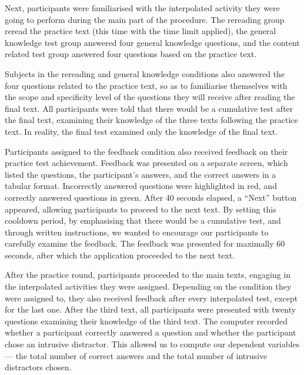 \documentclass[11pt,]{article}
\begin{document}
Next, participants were familiarised with the interpolated activity they
were going to perform during the main part of the procedure. The
rereading group reread the practice text (this time with the time limit
applied), the general knowledge test group answered four general
knowledge questions, and the content related test group answered four
questions based on the practice text.

Subjects in the rereading and general knowledge conditions also answered
the four questions related to the practice text, so as to familiarise
themselves with the scope and specificity level of the questions they
will receive after reading the final text. All participants were told
that there would be a cumulative test after the final text, examining
their knowledge of the three texts following the practice text. In
reality, the final test examined only the knowledge of the final text.

Participants assigned to the feedback condition also received feedback
on their practice test achievement. Feedback was presented on a separate
screen, which listed the questions, the participant's answers, and the
correct answers in a tabular format. Incorrectly answered questions were
highlighted in red, and correctly answered questions in green. After 40
seconds elapsed, a ``Next'' button appeared, allowing participants to
proceed to the next text. By setting this cooldown period, by
emphasising that there would be a cumulative test, and through written
instructions, we wanted to encourage our participants to carefully
examine the feedback. The feedback was presented for maximally 60
seconds, after which the application proceeded to the next text.

After the practice round, participants proceeded to the main texts,
engaging in the interpolated activities they were assigned. Depending on
the condition they were assigned to, they also received feedback after
every interpolated test, except for the last one. After the third text,
all participants were presented with twenty questions examining their
knowledge of the third text. The computer recorded whether a participant
correctly answered a question and whether the participant chose an
intrusive distractor. This allowed us to compute our dependent variables
--- the total number of correct answers and the total number of
intrusive distractors chosen.
\end{document}
